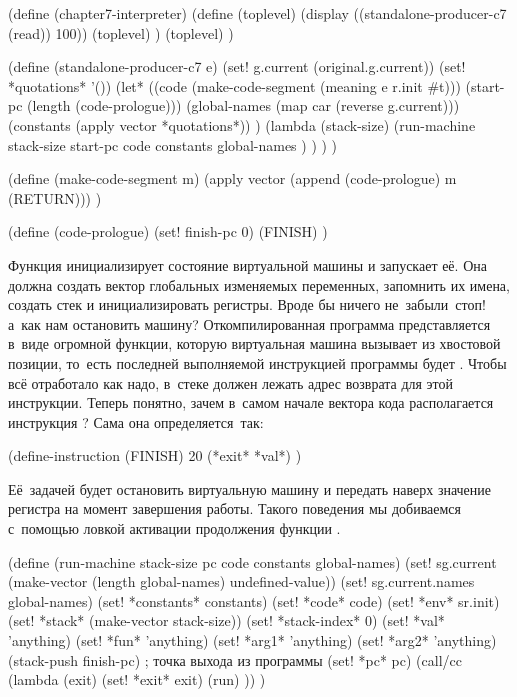 \begin{code:lisp}
(define (chapter7-interpreter)
  (define (toplevel)
    (display ((standalone-producer-c7 (read)) 100))
    (toplevel) )
  (toplevel) )

(define (standalone-producer-c7 e)
  (set! g.current (original.g.current))
  (set! *quotations* '())
  (let* ((code (make-code-segment (meaning e r.init #t)))
         (start-pc (length (code-prologue)))
         (global-names (map car (reverse g.current)))
         (constants (apply vector *quotations*)) )
    (lambda (stack-size)
      (run-machine stack-size start-pc code
                   constants global-names ) ) ) )

(define (make-code-segment m)
  (apply vector (append (code-prologue) m (RETURN))) )

(define (code-prologue)
  (set! finish-pc 0)
  (FINISH) )
\end{code:lisp}

Функция  инициализирует состояние виртуальной машины и запускает
её. Она должна создать вектор глобальных изменяемых переменных, запомнить их
имена, создать стек и инициализировать регистры. Вроде бы ничего
не~забыли\textdots\ стоп! а~как нам остановить машину? Откомпилированная
программа представляется в~виде огромной функции, которую виртуальная машина
вызывает из хвостовой позиции, то~есть последней выполняемой инструкцией
программы будет . Чтобы всё отработало как надо, в~стеке должен
лежать адрес возврата для этой инструкции. Теперь понятно, зачем в~самом начале
вектора кода располагается инструкция ? Сама она определяется~так:

\begin{code:lisp}
(define-instruction (FINISH) 20
  (*exit* *val*) )
\end{code:lisp}

Её~задачей будет остановить виртуальную машину и передать наверх значение
регистра  на момент завершения работы. Такого поведения мы добиваемся
с~помощью ловкой активации продолжения функции .

\begin{code:lisp}
(define (run-machine stack-size pc code constants global-names)
  (set! sg.current (make-vector (length global-names) undefined-value))
  (set! sg.current.names global-names)
  (set! *constants*   constants)
  (set! *code*        code)
  (set! *env*         sr.init)
  (set! *stack*       (make-vector stack-size))
  (set! *stack-index* 0)
  (set! *val*         'anything)
  (set! *fun*         'anything)
  (set! *arg1*        'anything)
  (set! *arg2*        'anything)
  (stack-push finish-pc)         ; точка выхода из программы
  (set! *pc*          pc)
  (call/cc (lambda (exit)
             (set! *exit* exit)
             (run) )) )
\end{code:lisp}


